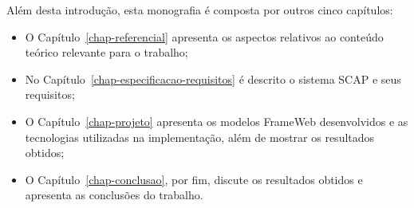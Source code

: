 
Além desta introdução, esta monografia é composta por outros cinco capítulos:

\begin{itemize}
	\item O Capítulo~\ref{chap-referencial} apresenta os aspectos relativos ao conteúdo teórico relevante para o trabalho;
	\item No Capítulo~\ref{chap-especificacao-requisitos} é descrito o sistema SCAP e seus requisitos;
	\item O Capítulo~\ref{chap-projeto} apresenta os modelos FrameWeb desenvolvidos e as tecnologias utilizadas na implementação, além de mostrar os resultados obtidos;
	\item O Capítulo~\ref{chap-conclusao}, por fim, discute os resultados obtidos e apresenta as conclusões do trabalho.
\end{itemize}


